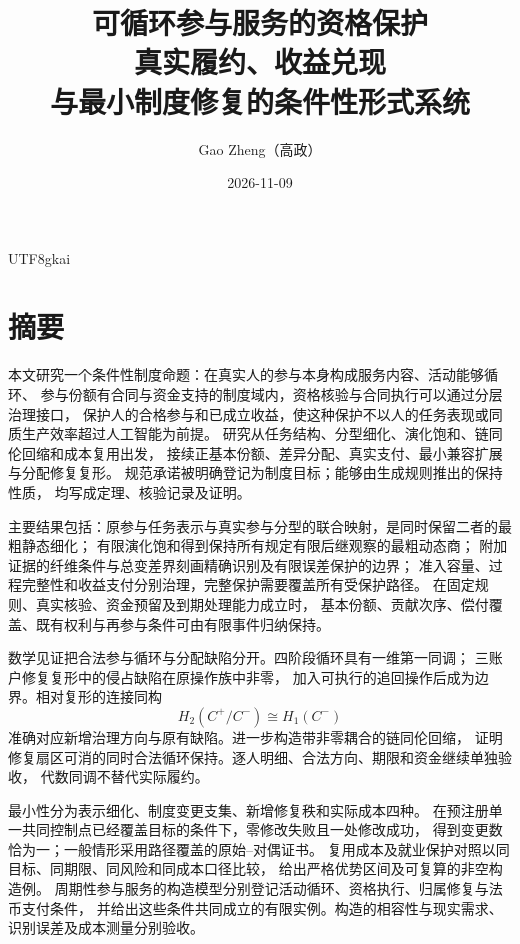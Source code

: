 \documentclass[12pt,a4paper,openany]{report}
\begin{document}
\begin{CJK*}{UTF8}{gkai}
\makeatletter
{}
\makeatother
\raggedbottom
{}
\hypersetup{pageanchor=false}
\title{可循环参与服务的资格保护\\[0.5em]
\large 真实履约、收益兑现\\与最小制度修复的条件性形式系统}
\author{Gao Zheng（高政）}
\date{2026-11-09}
\maketitle
\setcounter{page}{2}
\hypersetup{pageanchor=true}

\chapter*{摘要}
本文研究一个条件性制度命题：在真实人的参与本身构成服务内容、活动能够循环、
参与份额有合同与资金支持的制度域内，资格核验与合同执行可以通过分层治理接口，
保护人的合格参与和已成立收益，使这种保护不以人的任务表现或同质生产效率超过人工智能为前提。
研究从任务结构、分型细化、演化饱和、链同伦回缩和成本复用出发，
接续正基本份额、差异分配、真实支付、最小兼容扩展与分配修复复形。
规范承诺被明确登记为制度目标；能够由生成规则推出的保持性质，
均写成定理、核验记录及证明。

主要结果包括：原参与任务表示与真实参与分型的联合映射，是同时保留二者的最粗静态细化；
有限演化饱和得到保持所有规定有限后继观察的最粗动态商；
附加证据的纤维条件与总变差界刻画精确识别及有限误差保护的边界；
准入容量、过程完整性和收益支付分别治理，完整保护需要覆盖所有受保护路径。
在固定规则、真实核验、资金预留及到期处理能力成立时，
基本份额、贡献次序、偿付覆盖、既有权利与再参与条件可由有限事件归纳保持。

数学见证把合法参与循环与分配缺陷分开。四阶段循环具有一维第一同调；
三账户修复复形中的侵占缺陷在原操作族中非零，
加入可执行的追回操作后成为边界。相对复形的连接同构
\[
H_2(C^+/C^-)\cong H_1(C^-)
\]
准确对应新增治理方向与原有缺陷。进一步构造带非零耦合的链同伦回缩，
证明修复扇区可消的同时合法循环保持。逐人明细、合法方向、期限和资金继续单独验收，
代数同调不替代实际履约。

最小性分为表示细化、制度变更支集、新增修复秩和实际成本四种。
在预注册单一共同控制点已经覆盖目标的条件下，零修改失败且一处修改成功，
得到变更数恰为一；一般情形采用路径覆盖的原始--对偶证书。
复用成本及就业保护对照以同目标、同期限、同风险和同成本口径比较，
给出严格优势区间及可复算的非空构造例。
周期性参与服务的构造模型分别登记活动循环、资格执行、归属修复与法币支付条件，
并给出这些条件共同成立的有限实例。构造的相容性与现实需求、识别误差及成本测量分别验收。


\end{CJK*}
\end{document}

